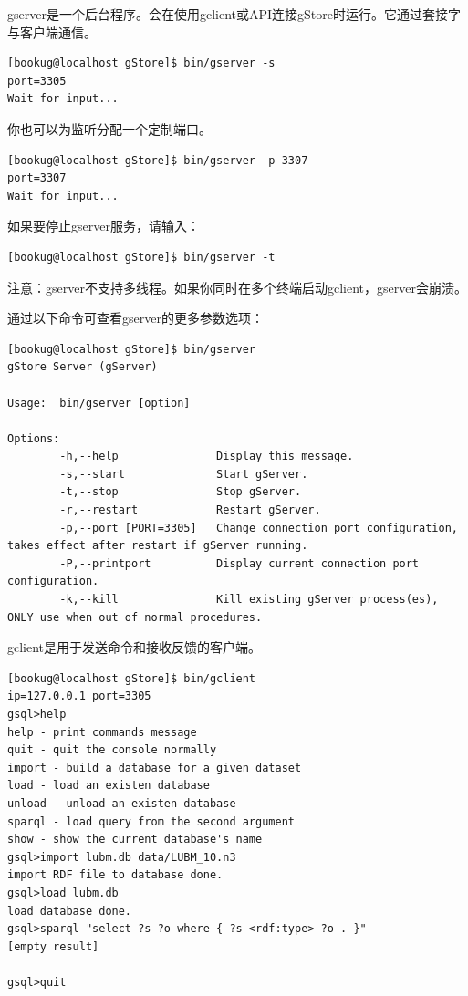 \documentclass[titlepage, a4paper, 12pt]{article}
\begin{document}
gserver是一个后台程序。会在使用gclient或API连接gStore时运行。它通过套接字与客户端通信。

\begin{verbatim}
[bookug@localhost gStore]$ bin/gserver -s
port=3305
Wait for input...
\end{verbatim}

你也可以为监听分配一个定制端口。

\begin{verbatim}
[bookug@localhost gStore]$ bin/gserver -p 3307
port=3307
Wait for input...
\end{verbatim}

如果要停止gserver服务，请输入：

\begin{verbatim}
[bookug@localhost gStore]$ bin/gserver -t
\end{verbatim}

注意：gserver不支持多线程。如果你同时在多个终端启动gclient，gserver会崩溃。

通过以下命令可查看gserver的更多参数选项：

\begin{verbatim}
[bookug@localhost gStore]$ bin/gserver
gStore Server (gServer)

Usage:  bin/gserver [option]

Options:
		-h,--help               Display this message.
		-s,--start              Start gServer.
		-t,--stop               Stop gServer.
		-r,--restart            Restart gServer.
		-p,--port [PORT=3305]   Change connection port configuration, takes effect after restart if gServer running.
		-P,--printport          Display current connection port configuration.
		-k,--kill               Kill existing gServer process(es), ONLY use when out of normal procedures.
\end{verbatim}


gclient是用于发送命令和接收反馈的客户端。

\begin{verbatim}
[bookug@localhost gStore]$ bin/gclient
ip=127.0.0.1 port=3305
gsql>help
help - print commands message
quit - quit the console normally
import - build a database for a given dataset
load - load an existen database
unload - unload an existen database
sparql - load query from the second argument
show - show the current database's name
gsql>import lubm.db data/LUBM_10.n3
import RDF file to database done.
gsql>load lubm.db
load database done.
gsql>sparql "select ?s ?o where { ?s <rdf:type> ?o . }"
[empty result]

gsql>quit
\end{verbatim}
\end{document}
